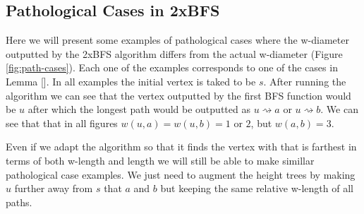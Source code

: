 \subsection{Pathological Cases in 2xBFS}

Here we will present some examples of pathological cases where the w-diameter outputted by the 2xBFS algorithm differs from the actual w-diameter (Figure \ref{fig:path-cases}). Each one of the examples corresponds to one of the cases in Lemma []. In all examples the initial vertex is taked to be $s$. After running the algorithm we can see that the vertex outputted by the first BFS function would be $u$ after which the longest path would be outputted as $u \rightsquigarrow a$ or $u \rightsquigarrow b$. We can see that that in all figures $w(u, a) = w(u, b) = 1 \text{ or } 2$, but $w(a, b) = 3$.

Even if we adapt the algorithm so that it finds the vertex with that is farthest in terms of both w-length and length we will still be able to make simillar pathological case examples. We just need to augment the height trees by making $u$ further away from $s$ that $a$ and $b$ but keeping the same relative w-length of all paths.

